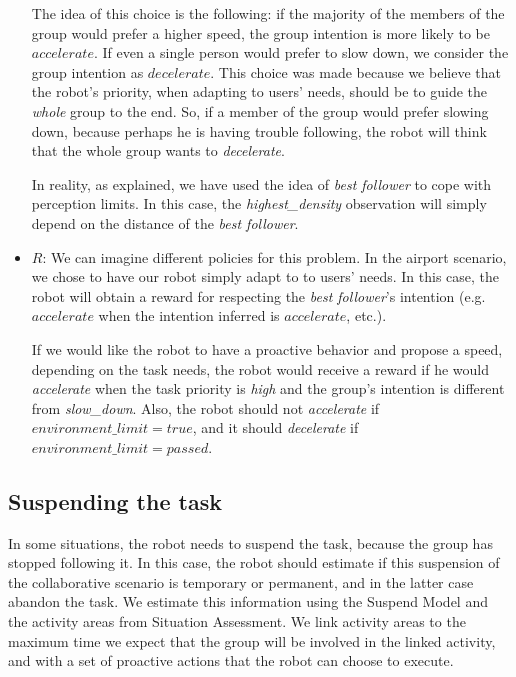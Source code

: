 \begin{itemize}
		The idea of this choice is the following: if the majority of the members of the group would prefer a higher speed, the group intention is more likely to be $accelerate$. If even a single person would prefer to slow down, we consider the group intention as $decelerate$. This choice was made because we believe that the robot's priority, when adapting to users' needs, should be to guide the \textit{whole} group to the end. So, if a member of the group would prefer slowing down, because perhaps he is having trouble following, the robot will think that the whole group wants to \textit{decelerate}.

		In reality, as explained, we have used the idea of \textit{best follower} to cope with perception limits. In this case, the \textit{highest\_density} observation will simply depend on the distance of the \textit{best follower}.

	\item  $R$: We can imagine different policies for this problem. In the airport scenario, we chose to have our robot simply adapt to to users' needs. In this case, the robot will obtain a reward for respecting the \textit{best follower}'s intention (e.g. $accelerate$ when the intention inferred is $accelerate$, etc.). 

	If we would like the robot to have a proactive behavior and propose a speed, depending on the task needs, the robot would receive a reward if he would \textit{accelerate} when the task priority is \textit{high} and the group's intention is different from \textit{slow\_down}. Also, the robot should not \textit{accelerate} if $environment\_limit=true$, and it should \textit{decelerate} if $environment\_limit=passed$.

\end{itemize}



\subsection{Suspending the task}
In some situations, the robot needs to suspend the task, because the group has stopped following it. In this case, the robot should estimate if this suspension of the collaborative scenario is temporary or permanent, and in the latter case abandon the task. We estimate this information using the Suspend Model and the activity areas from Situation Assessment. We link activity areas to the maximum time we expect that the group will be involved in the linked activity, and with a set of proactive actions that the robot can choose to execute.

